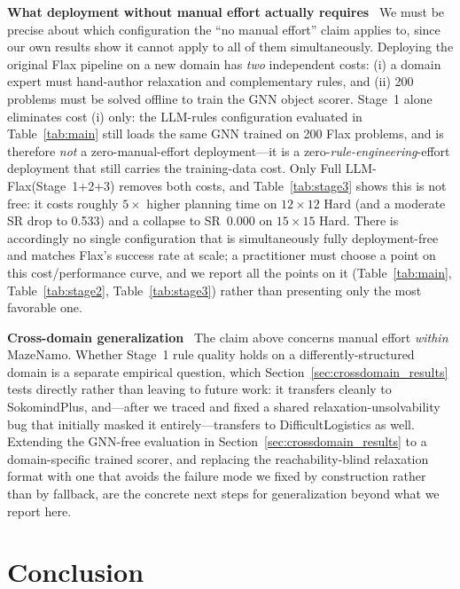 \documentclass[letterpaper, 10pt, journal, twoside]{IEEEtran}
\newcommand{\sref}[1]{Section~\ref{#1}}
\newcommand{\tref}[1]{Table~\ref{#1}}
\newcommand{\myparagraph}[1]{\noindent\textbf{#1}~}
\newcommand{\baseline}{Flax\xspace}
\newcommand{\fullmethod}{Full LLM-Flax\xspace}
\begin{document}
\myparagraph{What deployment without manual effort actually requires}
We must be precise about which configuration the ``no manual effort'' claim applies to, since our own results show it cannot apply to all of them simultaneously.
Deploying the original \baseline pipeline on a new domain has \emph{two} independent costs: (i) a domain expert must hand-author relaxation and complementary rules, and (ii) 200 problems must be solved offline to train the GNN object scorer.
Stage~1 alone eliminates cost (i) only: the LLM-rules configuration evaluated in \tref{tab:main} still loads the same GNN trained on 200 \baseline problems, and is therefore \emph{not} a zero-manual-effort deployment---it is a zero-\emph{rule-engineering}-effort deployment that still carries the training-data cost.
Only \fullmethod (Stage~1+2+3) removes both costs, and \tref{tab:stage3} shows this is not free: it costs roughly $5\times$ higher planning time on $12{\times}12$ Hard (and a moderate SR drop to 0.533) and a collapse to SR~0.000 on $15{\times}15$ Hard.
There is accordingly no single configuration that is simultaneously fully deployment-free and matches \baseline's success rate at scale; a practitioner must choose a point on this cost/performance curve, and we report all the points on it (\tref{tab:main}, \tref{tab:stage2}, \tref{tab:stage3}) rather than presenting only the most favorable one.

\myparagraph{Cross-domain generalization}
\label{sec:crossdomain}
The claim above concerns manual effort \emph{within} MazeNamo. Whether Stage~1 rule quality holds on a differently-structured domain is a separate empirical question, which \sref{sec:crossdomain_results} tests directly rather than leaving to future work: it transfers cleanly to SokomindPlus, and---after we traced and fixed a shared relaxation-unsolvability bug that initially masked it entirely---transfers to DifficultLogistics as well.
Extending the GNN-free evaluation in \sref{sec:crossdomain_results} to a domain-specific trained scorer, and replacing the reachability-blind relaxation format with one that avoids the failure mode we fixed by construction rather than by fallback, are the concrete next steps for generalization beyond what we report here.


\section{Conclusion}
\label{sec:conclusion}
\end{document}
